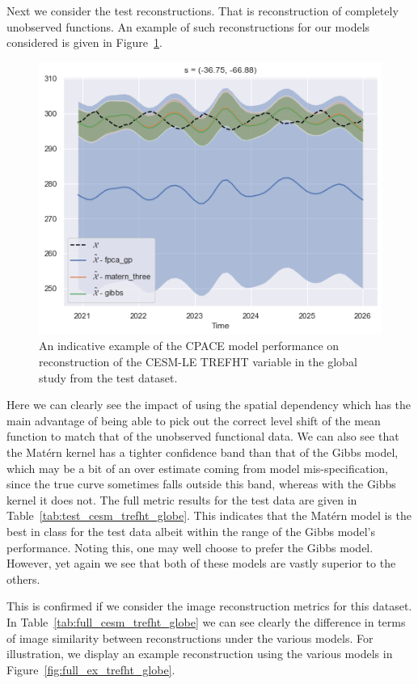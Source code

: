 Next we consider the test reconstructions.
That is reconstruction of completely unobserved functions. 
An example of such reconstructions for our models considered is given in Figure~\ref{fig:test_ex_trefht_globe}.

\begin{figure}
	\centering
	\includegraphics[width=\textwidth]{test_ex_trefht_globe}
	\caption{An indicative example of the CPACE model performance on reconstruction of the CESM-LE TREFHT variable in the global study from the test dataset.}
	\label{fig:test_ex_trefht_globe}
\end{figure}

Here we can clearly see the impact of using the spatial dependency which has the main advantage of being able to pick out the correct level shift of the mean function to match that of the unobserved functional data. 
We can also see that the Mat\'ern kernel has a tighter confidence band than that of the Gibbs model, which may be a bit of an over estimate coming from model mis-specification, since the true curve sometimes falls outside this band, whereas with the Gibbs kernel  it does not. 
The full metric results for the test data are given in Table~\ref{tab:test_cesm_trefht_globe}. 
This indicates that the Mat\'ern model is the best in class for the test data albeit within the range of the Gibbs model's performance. 
Noting this, one may well choose to prefer the Gibbs model.
However, yet again we see that both of these models are vastly superior to the others.

This is confirmed if we consider the image reconstruction metrics for this dataset.
In Table~\ref{tab:full_cesm_trefht_globe} we can see clearly the difference in terms of image similarity between reconstructions under the various models. 
For illustration, we display an example reconstruction using the various models in Figure~\ref{fig:full_ex_trefht_globe}.

